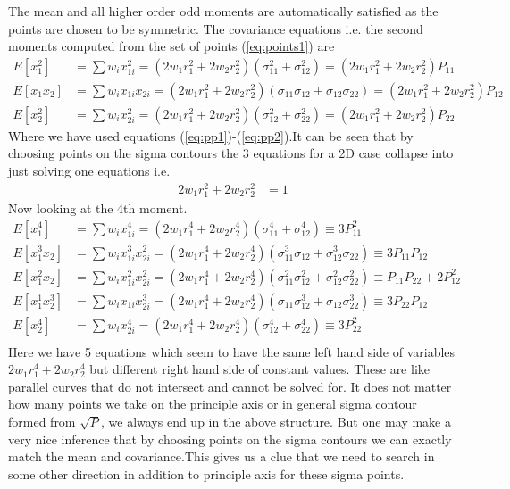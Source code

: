 \documentclass{article}
\begin{document}
 The mean and all higher order odd moments are automatically satisfied as the points are chosen to be symmetric. The covariance equations i.e. the second moments computed from the set of points (\ref{eq:points1}) are
\begin{align*} 
E[x_1^2]&=\sum{w_ix_{1i}^2}=(2w_1r_1^2+2w_2r_2^2)(\sigma_{11}^2+\sigma_{12}^2)=(2w_1r_1^2+2w_2r_2^2)P_{11}\\ E[x_1x_2]&=\sum{w_ix_{1i}x_{2i}}=(2w_1r_1^2+2w_2r_2^2)(\sigma_{11}\sigma_{12}+\sigma_{12}\sigma_{22})=(2w_1r_1^2+2w_2r_2^2)P_{12}\\
E[x_2^2]&=\sum{w_ix_{2i}^2}=(2w_1r_1^2+2w_2r_2^2)(\sigma_{12}^2+\sigma_{22}^2)=(2w_1r_1^2+2w_2r_2^2)P_{22}
 \end{align*} 
 Where we have used equations (\ref{eq:pp1})-(\ref{eq:pp2}).It can be seen that by choosing points on the sigma contours the 3 equations for a 2D case collapse into just solving one equations i.e.
 \begin{align}
 2w_1r_1^2+2w_2r_2^2&=1
 \end{align}
 Now looking at the 4th moment.
 \begin{align*} E[x_1^4]&=\sum{w_ix_{1i}^4}=(2w_1r_1^4+2w_2r_2^4)(\sigma_{11}^4+\sigma_{12}^4)\equiv 3P_{11}^2\\ E[x_1^3x_2]&=\sum{w_ix_{1i}^3x_{2i}^2}=(2w_1r_1^4+2w_2r_2^4)(\sigma_{11}^3\sigma_{12}+\sigma_{12}^3\sigma_{22})\equiv3P_{11}P_{12}\\
E[x_1^2x_2]&=\sum{w_ix_{1i}^2x_{2i}^2}=(2w_1r_1^4+2w_2r_2^4)(\sigma_{11}^2\sigma_{12}^2+\sigma_{12}^2\sigma_{22}^2)\equiv P_{11}P_{22}+2P_{12}^2\\
E[x_1^1x_2^3]&=\sum{w_ix_{1i}x_{2i}^3}=(2w_1r_1^4+2w_2r_2^4)(\sigma_{11}\sigma_{12}^3+\sigma_{12}\sigma_{22}^3)\equiv 3P_{22}P_{12}\\
E[x_2^4]&=\sum{w_ix_{2i}^4}=(2w_1r_1^4+2w_2r_2^4)(\sigma_{12}^4+\sigma_{22}^4)\equiv 3P_{22}^2\\ 
 \end{align*}
Here we have 5 equations which seem to have the same left hand side of variables $2w_1r_1^4+2w_2r_2^4$ but different right hand side of constant values. These are like parallel curves that do not intersect and cannot be solved for. It does not matter how many points we take on the principle axis or in general sigma contour formed from $\sqrt{P}$, we always end up in the above structure. But one may make a very nice inference that by choosing points on the sigma contours we can exactly match the mean and covariance.This gives us a clue that we need to search in some other direction in addition to principle axis for these sigma points.\newline\newline
\end{document}
